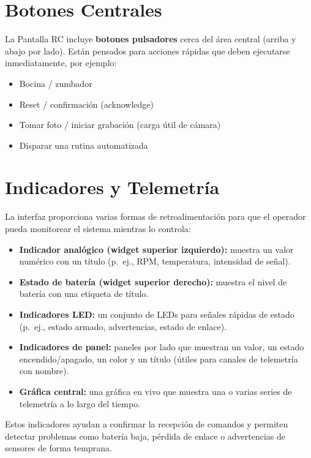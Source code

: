 \section{Botones Centrales}
\label{sec:center-buttons}

La Pantalla RC incluye \textbf{botones pulsadores} cerca del área central (arriba y abajo por lado). Están pensados para acciones rápidas que deben ejecutarse inmediatamente, por ejemplo:

\begin{itemize}
    \item Bocina / zumbador
    \item Reset / confirmación (acknowledge)
    \item Tomar foto / iniciar grabación (carga útil de cámara)
    \item Disparar una rutina automatizada
\end{itemize}

\section{Indicadores y Telemetría}
\label{sec:telemetry}

La interfaz proporciona varias formas de retroalimentación para que el operador pueda monitorear el sistema mientras lo controla:

\begin{itemize}
    \item \textbf{Indicador analógico (widget superior izquierdo):} muestra un valor numérico con un título (p.\ ej., RPM, temperatura, intensidad de señal).
    \item \textbf{Estado de batería (widget superior derecho):} muestra el nivel de batería con una etiqueta de título.
    \item \textbf{Indicadores LED:} un conjunto de LEDs para señales rápidas de estado (p.\ ej., estado armado, advertencias, estado de enlace).
    \item \textbf{Indicadores de panel:} paneles por lado que muestran un valor, un estado encendido/apagado, un color y un título (útiles para canales de telemetría con nombre).
    \item \textbf{Gráfica central:} una gráfica en vivo que muestra una o varias series de telemetría a lo largo del tiempo.
\end{itemize}

Estos indicadores ayudan a confirmar la recepción de comandos y permiten detectar problemas como batería baja, pérdida de enlace o advertencias de sensores de forma temprana.

